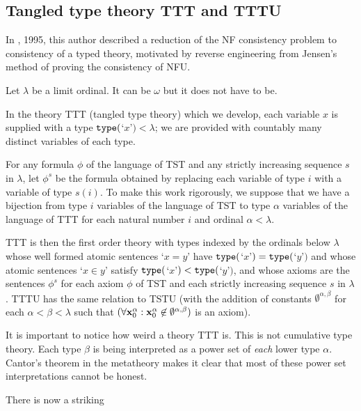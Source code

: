 \documentclass[112pt]{article}
\begin{document}
\newpage

\subsection{Tangled type theory TTT and TTTU}

In \cite{tangled}, 1995, this author described a reduction of the NF consistency problem to consistency of a typed theory,  motivated by reverse engineering from Jensen's method of proving the consistency of NFU.

Let $\lambda$ be a limit ordinal.  It can be $\omega$ but it does not have to be.  

In the theory TTT (tangled type theory) which we develop, each variable $x$ is supplied with a type ${\tt type}($`$x$'$) <\lambda$;  we are provided with countably many distinct variables of each type.

For any formula $\phi$ of the language of TST and any strictly increasing sequence $s$ in $\lambda$, let $\phi^s$ be the formula obtained by replacing each variable
of type $i$ with a variable of type $s(i)$.  To make this work rigorously, we suppose that we have a bijection from type $i$ variables of the language of TST to type $\alpha$ variables
of the language of TTT for each natural number $i$ and ordinal $\alpha<\lambda$.

TTT is then the first order theory with types indexed by the ordinals below $\lambda$ whose well formed atomic sentences `$x=y$' have ${\tt type}($`$x$'$) = {\tt type}($`$y$'$)$ and whose atomic sentences `$x \in y$' satisfy ${\tt type}($`$x$'$) < {\tt type}($`$y$'$)$, and whose axioms are the sentences $\phi^s$ for each axiom $\phi$ of TST and each strictly increasing sequence $s$ in $\lambda$.  TTTU has the same relation to TSTU (with the addition of constants $\emptyset^{\alpha,\beta}$ for each $\alpha<\beta<\lambda$  such that $(\forall {\bf x}_0^{\alpha} :{\bf x}_0^{\alpha}\not\in \emptyset^{\alpha,\beta})$ is an axiom).

It is important to notice how weird a theory TTT is.  This is not cumulative type theory.  Each type $\beta$ is being interpreted as a power set of {\em each\/} lower type $\alpha$.  Cantor's theorem in the metatheory makes it clear that most of these power set interpretations cannot be honest.

There is now a striking
\end{document}
